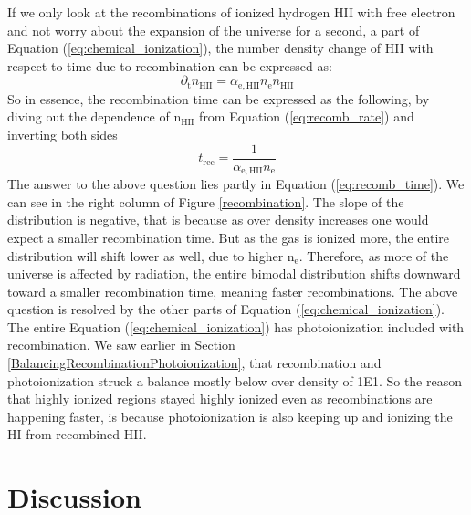 \documentclass[letterpaper,10pt]{article}
\renewcommand{\(}{\left(}
\renewcommand{\)}{\right)}
\begin{document}
If we only look at the recombinations of ionized hydrogen H{\footnotesize II} with free electron and not worry about the expansion of the universe for a second, a part of Equation (\ref{eq:chemical_ionization}), the number density change of H{\footnotesize II} with respect to time due to recombination can be expressed as:
\begin{equation}
\label{eq:recomb_rate}
   \partial_\mathrm{t} n_\mathrm{HII}  = \alpha_\mathrm{e,HII}n_\mathrm{e} n_\mathrm{HII}
\end{equation}
So in essence, the recombination time can be expressed as the following, by diving out the dependence of n$_\mathrm{HII}$ from Equation (\ref{eq:recomb_rate}) and inverting both sides
\begin{equation}
\label{eq:recomb_time}
   t_\mathrm{rec} = \frac{1}{\alpha_\mathrm{e,HII}n_\mathrm{e}}
\end{equation}
The answer to the above question lies partly in Equation (\ref{eq:recomb_time}).  We can see in the right column of Figure \ref{recombination}.  The slope of the distribution is negative, that is because as over density increases one would expect a smaller recombination time.  But as the gas is ionized more, the entire distribution will shift lower as well, due to higher n$_\mathrm{e}$.  Therefore, as more of the universe is affected by radiation, the entire bimodal distribution shifts downward toward a smaller recombination time, meaning faster recombinations.  The above question is resolved by the other parts of Equation (\ref{eq:chemical_ionization}).  The entire Equation (\ref{eq:chemical_ionization}) has photoionization included with recombination.  We saw earlier in Section \ref{BalancingRecombinationPhotoionization}, that recombination and photoionization struck a balance mostly below over density of 1E1.  So the reason that highly ionized regions stayed highly ionized even as recombinations are happening faster, is because photoionization is also keeping up and ionizing the H{\footnotesize I} from recombined H{\footnotesize II}.


\section{Discussion}
\label{Discussion}

\end{document}
